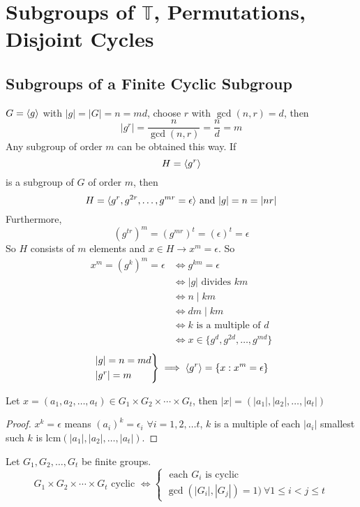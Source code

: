 \documentclass[openany]{report}
\begin{document}
\chapter{Subgroups of $\mathbb{T}$, Permutations, Disjoint Cycles}

\section{Subgroups of a Finite Cyclic Subgroup}
$G = \langle g \rangle$ with $|g| = |G| = n = md$, choose $r$ with $\gcd(n,r) = d$, then
\[|g^r| = \frac{n}{\gcd(n,r)} = \frac{n}{d} = m\]
Any subgroup of order $m$ can be obtained this way. If 
\[H = \langle g^r \rangle\]
is a subgroup of $G$ of order $m$, then
\[H = \langle g^r, g^{2r}, \dots, g^{mr} = \epsilon \rangle\text { and } |g| = n = |nr|\]
Furthermore, 
\[(g^{tr})^m  = (g^{mr})^t = (\epsilon)^t = \epsilon\]
So $H$ consists of $m$ elements and $x \in H \rightarrow x^m = \epsilon$. So
\begin{align*}
    x^m = (g^k)^m = \epsilon &\iff g^{km} =\epsilon\\
    &\iff |g| \text{ divides $km$}\\
    &\iff n \mid km \\
    &\iff dm \mid km\\
    &\iff k \text{ is a multiple of $d$}\\
    &\iff x \in \{g^{d}, g^{2d}, \ldots, g^{md}\}
\end{align*}
\[\begin{rcases}
    |g| = n = md\\
    |g^r| = m 
\end{rcases} \implies \langle g^r \rangle = \{x: x^m = \epsilon\}\]
\begin{prop}
    Let $x = (a_1, a_2, \ldots, a_t) \in G_1 \times G_2 \times \cdots \times G_t$, then $|x| = (|a_1|, |a_2|, \ldots, |a_t|)$
\end{prop}
\begin{proof}
    $x^k = \epsilon$ means $(a_i)^k = \epsilon_i$ $\forall i = 1,2, \ldots t$, $k$ is a multiple of each $|a_i|$ smallest such $k$ is lcm$(|a_1|, |a_2|, \ldots, |a_t|)$. 
\end{proof}
\begin{prop}
    Let $G_1, G_2, \ldots, G_t$ be finite groups. 
    \[G_1 \times G_2 \times \cdots \times G_t \text{ cyclic } \iff \begin{cases}
        \text{ each $G_i$ is cyclic}\\
        \gcd(|G_i|, |G_j|) = 1) \ \forall 1 \leq i < j \leq t
    \end{cases}\]
\end{prop}
\end{document}
